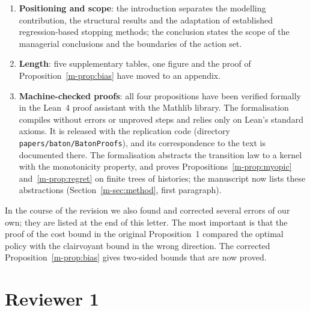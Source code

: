 \documentclass[11pt]{article}
\newcommand{\sref}[1]{Section~\ref{m-#1}}
\newcommand{\tref}[1]{Table~\ref{m-#1}}
\begin{document}
\begin{enumerate}[leftmargin=1.4em]
  mean differences, 95\% bootstrap confidence intervals, win counts,
  effect sizes and Holm-adjusted tests per gate (\tref{tab:stats}),
  paired intervals for the key contrast of every robustness table,
  tail-risk measures (\tref{tab:tail}) and route-level results as
  supplementary data.
\item \textbf{Positioning and scope}: the introduction separates the
  modelling contribution, the structural results and the adaptation of
  established regression-based stopping methods; the conclusion states
  the scope of the managerial conclusions and the boundaries of the
  action set.
\item \textbf{Length}: five supplementary tables, one figure and the
  proof of Proposition~\ref{m-prop:bias} have moved to an appendix.
\item \textbf{Machine-checked proofs}: all four propositions have been
  verified formally in the Lean~4 proof assistant with the Mathlib
  library. The formalisation compiles without errors or unproved steps
  and relies only on Lean's standard axioms. It is released with the
  replication code (directory \texttt{papers/baton/BatonProofs}), and its
  correspondence to the text is documented there. The formalisation
  abstracts the transition law to a kernel with the monotonicity
  property, and proves Propositions~\ref{m-prop:myopic}
  and~\ref{m-prop:regret} on finite trees of histories; the manuscript
  now lists these abstractions (\sref{sec:method}, first paragraph).
\end{enumerate}

In the course of the revision we also found and corrected several
errors of our own; they are listed at the end of this letter. The most
important is that the proof of the cost bound in the original
Proposition~1 compared the optimal policy with the clairvoyant bound in
the wrong direction. The corrected Proposition~\ref{m-prop:bias} gives
two-sided bounds that are now proved.

\section*{Reviewer 1}
\end{document}
